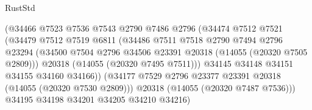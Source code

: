 \begin{lexlean}{RustStd}
\begin{coremodule}
                                      (@34466
                                        @7523
                                        @7536
                                        @7543
                                        @2790
                                        @7486
                                        @2796
                                        (@34474
                                          @7512
                                          @7521
                                          (@34479
                                            @7512
                                            @7519
                                            @6811
                                            (@34486
                                              @7511
                                              @7518
                                              @2790
                                              @7494
                                              @2796
                                              @23294
                                              (@34500
                                                @7504
                                                @2796
                                                @34506
                                                @23391
                                                @20318
                                                (@14055 (@20320 @7505 @2809)))
                                              @20318
                                              (@14055 (@20320 @7495 @7511)))
                                            @34145
                                            @34148
                                            @34151
                                            @34155
                                            @34160
                                            @34166))
                                        (@34177
                                          @7529
                                          @2796
                                          @23377
                                          @23391
                                          @20318
                                          (@14055 (@20320 @7530 @2809)))
                                        @20318
                                        (@14055 (@20320 @7487 @7536)))
                                      @34195
                                      @34198
                                      @34201
                                      @34205
                                      @34210
                                      @34216)

\end{coremodule}
\end{lexlean}
